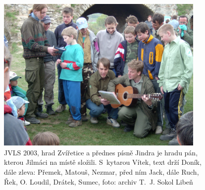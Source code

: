 \documentclass[a5paper, 11pt, twoside]{article}
\begin{document}
\begin{figure}[h]
  \centering 
  \includegraphics[width=0.9\textwidth]{img/78_jilm_zviretice.JPG}
  \caption*{JVLS 2003, hrad Zvířetice a přednes písně Jindra je hradu pán,
  kterou Jilmáci na místě složili. S~kytarou Vítek, text drží Doník, dále
  zleva: Přemek, Matouš, \mbox{Nezmar}, před ním Jack, dále Ruch, Řek, O. Loudil,
  Drátek, Sumec, foto: archiv T.~J. Sokol Libeň}
\end{figure}
\end{document}
